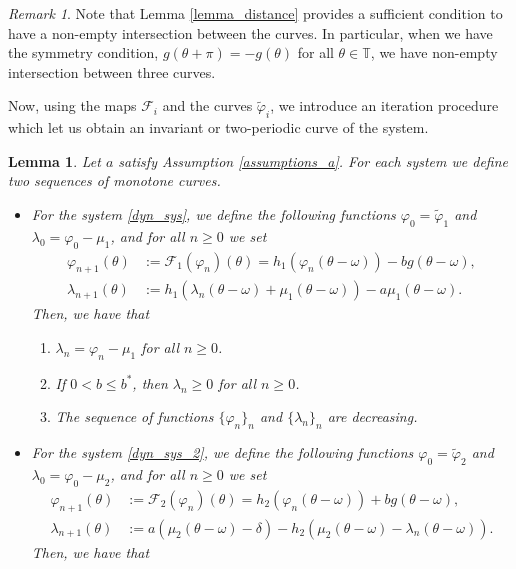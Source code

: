 \documentclass[12pt]{article}
\newcommand{\T}{\mathbb{T}}
\theoremstyle{plain}
\newtheorem{lemma}[defn]{Lemma}
\theoremstyle{remark}
\newtheorem{remark}[defn]{Remark}
\theoremstyle{definition}
\begin{document}
\begin{remark}
    Note that Lemma \ref{lemma_distance} provides a sufficient condition to have a non-empty intersection between the curves. In particular, when we have the symmetry condition, $g(\theta+\pi)=-g(\theta)$ for all $\theta\in\T$, we have non-empty intersection between three curves.
\end{remark}
Now, using the maps $\mathcal{F}_i$ and the curves $\tilde\varphi_i$, we introduce an iteration procedure which let us obtain an invariant or two-periodic curve of the system.
\begin{lemma}\label{montonicity_lemma}
    Let $a$ satisfy Assumption \eqref{assumptions_a}. For each system we define two sequences of monotone curves. 
    \begin{itemize}
        \item For the system \eqref{dyn_sys}, we define the following functions $\varphi_0=\tilde\varphi_1$ and $\lambda_0 = \varphi_0-\mu_1$, and for all $n\geq0$ we set
        \begin{align*}
            \varphi_{n+1}(\theta) &:= \mathcal{F}_1(\varphi_n)(\theta) = h_1(\varphi_n(\theta-\omega)) -b g(\theta-\omega),\\
            \lambda_{n+1}(\theta) &:= h_1(\lambda_n(\theta-\omega) + \mu_1(\theta-\omega)) - a\mu_1(\theta-\omega).
        \end{align*}
        Then, we have that
        \begin{enumerate}
            \item $\lambda_n = \varphi_n-\mu_1$ for all $n\geq0$.
            \item If $0<b\leq b^*$, then $\lambda_n\geq 0$ for all $n\geq0$.
            \item The sequence of functions $\{\varphi_n\}_n$ and $\{\lambda_n\}_n$ are decreasing.
        \end{enumerate}
        \item For the system \eqref{dyn_sys_2}, we define the following functions $\varphi_0=\tilde\varphi_2$ and $\lambda_0 = \varphi_0-\mu_2$, and for all $n\geq0$ we set
        \begin{align*}
            \varphi_{n+1}(\theta) &:= \mathcal{F}_2(\varphi_n)(\theta) = h_{2}(\varphi_n(\theta-\omega)) + b g(\theta-\omega),\\
            \lambda_{n+1}(\theta) &:= a(\mu_2(\theta-\omega)-\delta) - h_{2}(\mu_2(\theta-\omega)-\lambda_n(\theta-\omega)).
        \end{align*}
        Then, we have that

\end{itemize}
\end{lemma}
\end{document}
